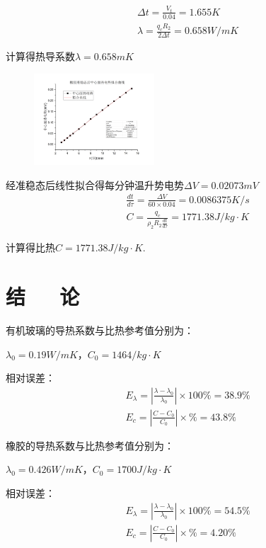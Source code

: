 \documentclass[10pt,a4paper,twocolumn,twoside,UTF8]{ctexart}
\begin{document}
\begin{align*}
	&\varDelta t =\frac{V_t}{0.04}=1.655K\\
    &\lambda=\frac{q_c R_2}{2\varDelta t}=0.658W/mK
\end{align*}

计算得热导系数$\lambda=0.658mK$


\begin{figure}[!h]
	\centering
	\includegraphics[width=0.4\textwidth]{img//7c.png}
	\label{fig:7c}
	\caption{}
\end{figure}
经准稳态后线性拟合得每分钟温升势电势$\varDelta V=0.02073mV$
\begin{align*}
	&\frac{dt}{d\tau}=\frac{\varDelta V}{60\times 0.04}=0.0086375K/s\\
    &C=\frac{q_c}{\rho_2 R_2 \frac{dt}{d\tau}}=1771.38J/kg\cdot K
\end{align*}

计算得比热$C=1771.38J/kg\cdot K$.


\section{结~~~论}
有机玻璃的导热系数与比热参考值分别为：

$\lambda_0=0.19W/mK$，$C_0=1464/kg\cdot K$

相对误差：
\begin{align*}
	&E_{\lambda}=\left\lvert \frac{\lambda-\lambda_0}{\lambda_0}\right\rvert \times 100\%= 38.9\%\\
    &E_c=\left\lvert \frac{C-C_0}{C_0}\right\rvert \times \%=43.8\%
\end{align*}

橡胶的导热系数与比热参考值分别为：

$\lambda_0=0.426W/mK$，$C_0=1700J/kg\cdot K$

相对误差：
\begin{align*}
	&E_{\lambda}=\left\lvert \frac{\lambda-\lambda_0}{\lambda_0}\right\rvert \times 100\%= 54.5\%\\
    &E_c=\left\lvert \frac{C-C_0}{C_0}\right\rvert \times \%=4.20\%
\end{align*}
\end{document}

